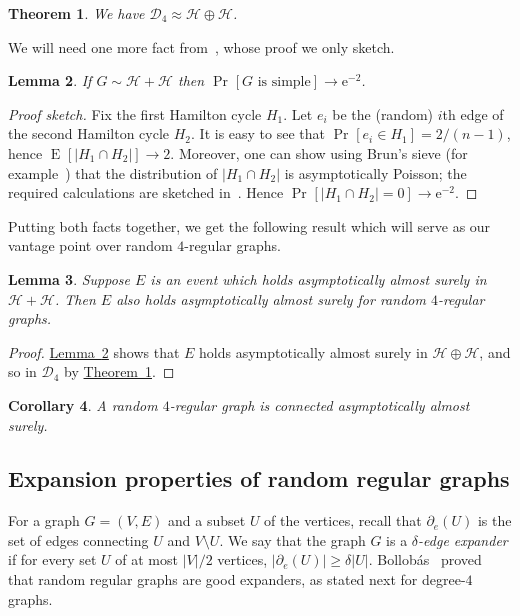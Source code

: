 \documentclass[11pt]{article}
\numberwithin{equation}{section}
\newtheorem{theorem}{Theorem}[section]
\newtheorem{lemma}[theorem]{Lemma}
\newtheorem{corollary}[theorem]{Corollary}
\theoremstyle{definition}
\theoremstyle{plain}
\newcommand{\eee}{\mathrm e}
\newcommand{\expref}[2]{\hyperref[#2]{#1~\ref{#2}}}
\theoremstyle{plain}
\theoremstyle{definition}
\DeclareMathOperator{\Expop}{E}
\newcommand{\prob}[2][]{\Pr_{#1} [ #2 ]}
\newcommand{\expectation}[2][]{\Expop_{#1} [ #2 ]}
\newcommand{\tends}{\longrightarrow}
\newcommand{\probspace}{\mathcal}
\newcommand{\psReg}{\probspace{D}}
\newcommand{\psHam}{\probspace{H}}
\newcommand{\edgeboundary}[1]{\partial_e(#1)}
\begin{document}
\begin{theorem} \label{thm:kim-wormald}
 We have $\psReg_4 \approx \psHam \oplus \psHam$.
\end{theorem}

We will need one more fact from~\cite{KW}, whose proof we only sketch.

\begin{lemma} \label{lem:ham}
 If $G \sim \psHam + \psHam$ then $\prob{G \text{ is simple}} \tends \eee^{-2}$.
\end{lemma}
\begin{proof}[Proof sketch]
 Fix the first Hamilton cycle $H_1$. Let $e_i$ be the (random) $i$th edge of the second Hamilton cycle $H_2$. It is easy to see that $\prob{e_i \in H_1} = 2/(n-1)$, hence $\expectation{|H_1 \cap H_2|} \tends 2$. Moreover, one can show using Brun's sieve (for example~\cite[Theorem 8.3.1]{AS}) that the distribution of $|H_1 \cap H_2|$ is asymptotically Poisson; the required calculations are sketched in~\cite[\S 2(iii)]{KW}. Hence $\prob{|H_1 \cap H_2| = 0} \tends \eee^{-2}$.
\end{proof}

Putting both facts together, we get the following result which will serve as our vantage point over random $4$-regular graphs.

\begin{lemma} \label{lem:model}
 Suppose $E$ is an event which holds asymptotically almost surely in $\psHam + \psHam$. Then $E$ also holds asymptotically almost surely for random $4$-regular graphs.
\end{lemma}
\begin{proof}
 \expref{Lemma}{lem:ham} shows that $E$ holds asymptotically almost surely in $\psHam \oplus \psHam$, and so in $\psReg_4$ by \expref{Theorem}{thm:kim-wormald}.
\end{proof}

\begin{corollary} \label{cor:connected}
 A random $4$-regular graph is connected asymptotically almost surely.
\end{corollary}

\subsection{Expansion properties of random regular graphs}

For a graph $G=(V,E)$ and a subset $U$ of the vertices, recall that $\edgeboundary{U}$ is the set of edges connecting $U$ and $V \setminus U$. We say that the graph $G$ is a \emph{$\delta$-edge expander} if for every set $U$ of at most $|V|/2$ vertices, $|\edgeboundary{U}| \geq \delta |U|$. Bollob\'as~\cite{Bollobas88Isoperimetric} proved that random regular graphs are good expanders, as stated next for degree-$4$ graphs.
\end{document}

